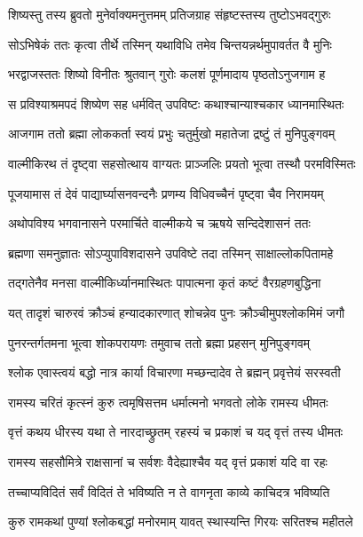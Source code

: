 \twolineshloka
{शिष्यस्तु तस्य ब्रुवतो मुनेर्वाक्यमनुत्तमम्}
{प्रतिजग्राह संहृष्टस्तस्य तुष्टोऽभवद्गुरुः} %

\twolineshloka
{सोऽभिषेकं ततः कृत्वा तीर्थे तस्मिन् यथाविधि}
{तमेव चिन्तयन्नर्थमुपावर्तत वै मुनिः} %

\twolineshloka
{भरद्वाजस्ततः शिष्यो विनीतः श्रुतवान् गुरोः}
{कलशं पूर्णमादाय पृष्ठतोऽनुजगाम ह} %

\twolineshloka
{स प्रविश्याश्रमपदं शिष्येण सह धर्मवित्}
{उपविष्टः कथाश्चान्याश्चकार ध्यानमास्थितः} %

\twolineshloka
{आजगाम ततो ब्रह्मा लोककर्ता स्वयं प्रभुः}
{चतुर्मुखो महातेजा द्रष्टुं तं मुनिपुङ्गवम्} %

\twolineshloka
{वाल्मीकिरथ तं दृष्ट्वा सहसोत्थाय वाग्यतः}
{प्राञ्जलिः प्रयतो भूत्वा तस्थौ परमविस्मितः} %

\twolineshloka
{पूजयामास तं देवं पाद्यार्घ्यासनवन्दनैः}
{प्रणम्य विधिवच्चैनं पृष्ट्वा चैव निरामयम्} %

\twolineshloka
{अथोपविश्य भगवानासने परमार्चिते}
{वाल्मीकये च ऋषये सन्दिदेशासनं ततः} %

\twolineshloka
{ब्रह्मणा समनुज्ञातः सोऽप्युपाविशदासने}
{उपविष्टे तदा तस्मिन् साक्षाल्लोकपितामहे} %

\twolineshloka
{तद्गतेनैव मनसा वाल्मीकिर्ध्यानमास्थितः}
{पापात्मना कृतं कष्टं वैरग्रहणबुद्धिना} %

\twolineshloka
{यत् तादृशं चारुरवं क्रौञ्चं हन्यादकारणात्}
{शोचन्नेव पुनः क्रौञ्चीमुपश्लोकमिमं जगौ} %

\twolineshloka
{पुनरन्तर्गतमना भूत्वा शोकपरायणः}
{तमुवाच ततो ब्रह्मा प्रहसन् मुनिपुङ्गवम्} %

\twolineshloka
{श्लोक एवास्त्वयं बद्धो नात्र कार्या विचारणा}
{मच्छन्दादेव ते ब्रह्मन् प्रवृत्तेयं सरस्वती} %

\twolineshloka
{रामस्य चरितं कृत्स्नं कुरु त्वमृषिसत्तम}
{धर्मात्मनो भगवतो लोके रामस्य धीमतः} %

\twolineshloka
{वृत्तं कथय धीरस्य यथा ते नारदाच्छ्रुतम्}
{रहस्यं च प्रकाशं च यद् वृत्तं तस्य धीमतः} %

\twolineshloka
{रामस्य सहसौमित्रे राक्षसानां च सर्वशः}
{वैदेह्याश्चैव यद् वृत्तं प्रकाशं यदि वा रहः} %

\twolineshloka
{तच्चाप्यविदितं सर्वं विदितं ते भविष्यति}
{न ते वागनृता काव्ये काचिदत्र भविष्यति} %

\twolineshloka
{कुरु रामकथां पुण्यां श्लोकबद्धां मनोरमाम्}
{यावत् स्थास्यन्ति गिरयः सरितश्च महीतले} %

